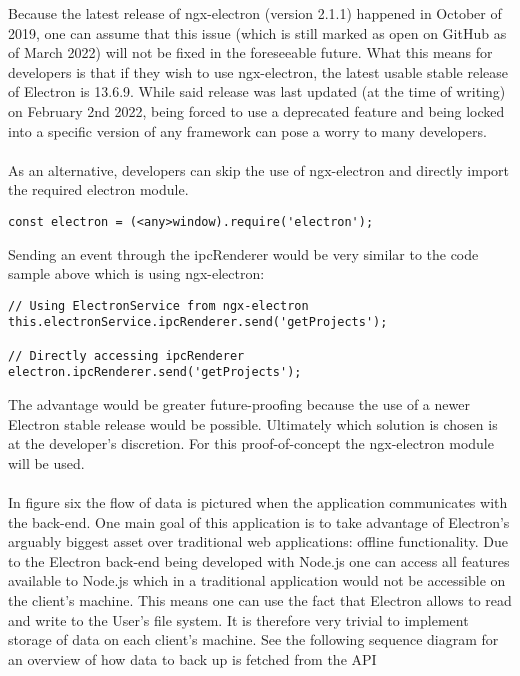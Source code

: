 Because the latest release of ngx-electron (version 2.1.1) happened in October of 2019, one can 
assume that this issue (which is still marked as open on GitHub as of March 2022) will not be fixed in 
the foreseeable future. \parencite{namespaceError}
What this means for developers is that if they wish to use ngx-electron, the latest usable stable release
of Electron is 13.6.9. 
While said release was last updated (at the time of writing) on February 2nd 2022, being forced to use
a deprecated feature and being locked into a specific version of any framework can pose a worry to 
many developers. \paragraph{}
As an alternative, developers can skip the use of ngx-electron and directly import the required electron module.
\begin{lstlisting}[caption=Sending an event with ngx-electron]
const electron = (<any>window).require('electron');
\end{lstlisting}
Sending an event through the ipcRenderer would be very similar to the code sample above which is using 
ngx-electron:
\begin{lstlisting}
// Using ElectronService from ngx-electron
this.electronService.ipcRenderer.send('getProjects');

// Directly accessing ipcRenderer
electron.ipcRenderer.send('getProjects');
\end{lstlisting}
The advantage would be greater future-proofing because the use of a newer Electron stable release would
be possible.
Ultimately which solution is chosen is at the developer's discretion. 
For this proof-of-concept the ngx-electron module will be used.\paragraph{}
In figure six the flow of data is pictured when the application communicates with
the back-end.
One main goal of this application is to take advantage of Electron's arguably biggest asset over 
traditional web applications: offline functionality.
Due to the Electron back-end being developed with Node.js one can access all features available to Node.js 
which in a traditional application would not be accessible on the client's machine.
This means one can use the fact that Electron allows to read and write to the User's file system. 
It is therefore very trivial to implement storage of data on each client's machine.  
See the following sequence diagram for an overview of how data to back up is fetched from the API 
